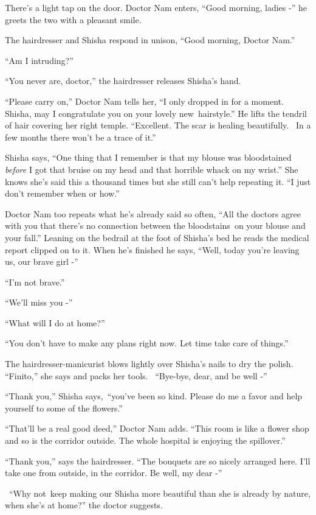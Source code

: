 \documentclass[twoside,11pt]{book}
\begin{document}
There's a light tap on the door. Doctor Nam enters, ``Good morning, ladies -'' he greets the
two with a pleasant smile.

The hairdresser and Shisha respond in unison, ``Good morning, Doctor Nam.''

``Am I intruding?''

``You never are, doctor,'' the hairdresser releases Shisha's hand.

``Please carry on,'' Doctor Nam tells her, ``I only dropped in for a moment.
Shisha, may I congratulate you on your lovely new~hairstyle.'' He lifts the tendril of hair covering her
right temple. ``Excellent. The scar is healing beautifully. ~In a few months there won't be a trace of
it.''

Shisha says, ``One thing that I remember is that my blouse was bloodstained \textit{before} I got that
bruise on my head and that horrible whack on my wrist.'' She knows she's said this a thousand times but
she still can't help repeating it. ``I just don't remember when or how.''

Doctor Nam too repeats what he's already said so often, ``All the doctors agree with you that there's no
connection between the bloodstains~on your blouse and your fall.'' Leaning on the bedrail at the foot of
Shisha's bed he reads the medical report clipped on to it. When he's finished he says, ``Well, today
you're leaving us, our brave girl -''

``I'm not brave.''

``We'll miss you -''

``What will I do at home?''

``You don't have to make any plans right now. Let time take care of things.''

The hairdresser-manicurist blows lightly over Shisha's nails to dry the polish. ``Finito,''
she says and packs her tools. ~``Bye-bye, dear, and be well -'' ~

``Thank you,'' Shisha says,~``you've been so kind. Please do me a favor and help
yourself to some of the flowers.''

``That'll be a real good deed,'' Doctor Nam adds. ``This room is like a flower
shop and so is the corridor outside. The whole hospital is enjoying the spillover.''

``Thank you,'' says the hairdresser. ``The bouquets are so nicely arranged here.
I'll take one from outside, in the corridor. Be well, my dear -''

~``Why not~keep making our Shisha more beautiful than she is already by nature, when she's at
home?'' the doctor suggests.
\end{document}
